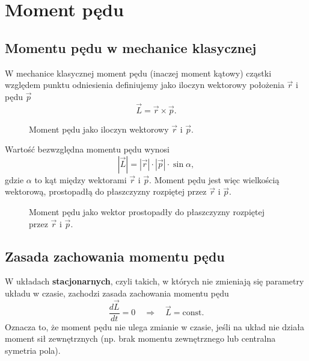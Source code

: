 \section{Moment pędu}

\subsection{Momentu pędu w mechanice klasycznej}
W mechanice klasycznej moment pędu (inaczej moment kątowy) cząstki względem punktu odniesienia definiujemy jako iloczyn wektorowy położenia $\vec{r}$ i pędu $\vec{p}$
$$
\vec{L} = \vec{r} \times \vec{p}.
$$
\begin{figure}[H]
\centering
{}
\caption{Moment pędu jako iloczyn wektorowy $\vec{r}$ i $\vec{p}$.}
\end{figure}

Wartość bezwzględna momentu pędu wynosi
$$
|\vec{L}| = |\vec{r}| \cdot |\vec{p}| \cdot \sin \alpha,
$$
gdzie $\alpha$ to kąt między wektorami $\vec{r}$ i $\vec{p}$. Moment pędu jest więc wielkością wektorową, prostopadłą do płaszczyzny rozpiętej przez $\vec{r}$ i $\vec{p}$.
\begin{figure}[H]
\centering
{}
\caption{Moment pędu jako wektor prostopadły do płaszczyzny rozpiętej przez $\vec{r}$ i $\vec{p}$.}
\end{figure}

\subsection{Zasada zachowania momentu pędu}
W układach \textbf{stacjonarnych}, czyli takich, w których nie zmieniają się parametry układu w czasie, zachodzi zasada zachowania momentu pędu
$$
\frac{d\vec{L}}{dt} = 0 \quad \Rightarrow \quad \vec{L} = \text{const.}
$$
Oznacza to, że moment pędu nie ulega zmianie w czasie, jeśli na układ nie działa moment sił zewnętrznych (np. brak momentu zewnętrznego lub centralna symetria pola).

